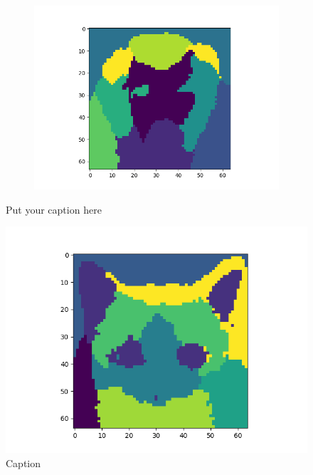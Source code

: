 \documentclass{article}
\begin{document}
\begin{figure}[H]
\begin{subfigure}{.33\textwidth}
  \label{fig:sub-second}
\end{subfigure}
\begin{subfigure}{.33\textwidth}
  \centering
  \includegraphics[width=1\linewidth]{2f/Dogs/Dogs represent.png}  
  
  \label{fig:sub-second}
\end{subfigure}
\caption{Put your caption here}
\label{reps}
\end{figure}
\begin{figure}[H]
    \centering
    \includegraphics[scale = 0.4]{2f/Cats/Data represent cats 2.png}
    \caption{Caption}
    \label{reps 2}
\end{figure}
\end{document}
